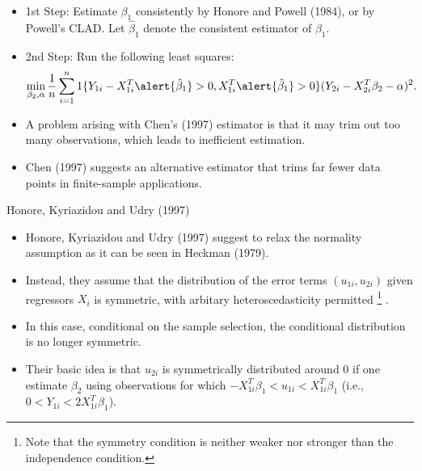 \documentclass[xcolor=svgnames,dvipdfmx,cjk]{beamer}
\theoremstyle{example}
\begin{document}
\begin{frame}
      \begin{itemize}
            \item \alert{1st Step}: Estimate $\beta_1$ consistently 
                  by Honore and Powell (1984), or by Powell's CLAD.
                  Let $\hat{\beta}_1$ denote the consistent estimator of $\beta_1$.
            \item \alert{2nd Step}: Run the following least squares:
                  \begin{align*}
                        \min_{\beta_2, \alpha}
                                \frac{1}{n} \sum_{i=1}^n 
                                1\{ %
                                    Y_{1i} - X_{1i}^T \alert{\hat{\beta}_1} > 0,
                                    X_{1i}^T \alert{\hat{\beta}_1} > 0                                
                                  \} 
                                (Y_{2i} - X_{2i}^T \beta_2 - \alpha)^2.
                  \end{align*}
            \item A problem arising with Chen's (1997) estimator is that 
                  it may trim out too many observations, which leads to inefficient estimation.
            \item Chen (1997) suggests an alternative estimator that trims far fewer data points in finite-sample applications.
      \end{itemize}
\end{frame}


\begin{frame}{Honore, Kyriazidou and Udry (1997)}
      \begin{itemize}
            \item Honore, Kyriazidou and Udry (1997) suggest to relax 
                  the normality assumption as it can be seen in Heckman (1979).
            \item Instead, they assume that 
                  the distribution of the error terms $(u_{1i}, u_{2i})$ 
                  given regressors $X_i$ is symmetric, 
                  with arbitary heteroscedasticity permitted
                  \footnote{Note that the symmetry condition is neither weaker nor stronger than the independence condition.
                  }
                  .
            \item In this case, conditional on the sample selection, 
                  the conditional distribution is no longer symmetric.
            \item Their basic idea is that 
                  \alert{
                  $u_{2i}$ is symmetrically distributed around $0$ 
                  }
                  if one estimate $\beta_2$  using 
                  \alert{
                  observations for which $-X_{1i}^T \beta_1 < u_{1i} < X_{1i}^T \beta_1$} 
                  (i.e., $0 < Y_{1i} < 2 X_{1i}^T \beta_1$).
      \end{itemize}
\end{frame}
\end{document}
